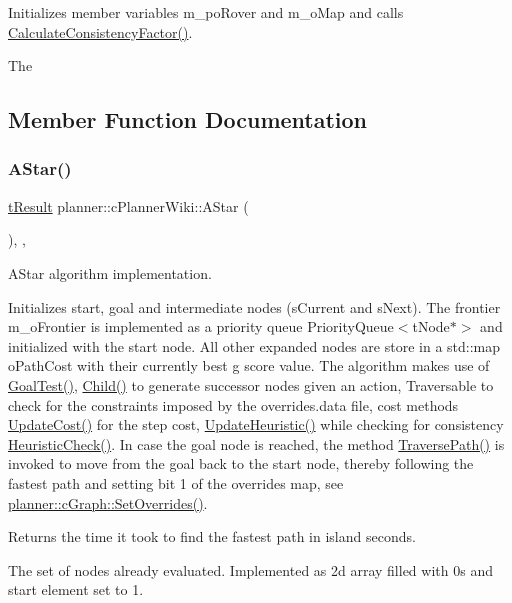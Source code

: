 Initializes member variables m\+\_\+po\+Rover and m\+\_\+o\+Map and calls \mbox{\hyperlink{classplanner_1_1c_planner_a2e5a745f83f903662eff914d8beddb5e}{Calculate\+Consistency\+Factor()}}. 

The 

\subsection{Member Function Documentation}
\mbox{\label{classplanner_1_1c_planner_wiki_a2652cf0e84d0a1fcd17e6c4288179955}} 
\subsubsection{\texorpdfstring{A\+Star()}{AStar()}}
{\footnotesize\ttfamily \mbox{\hyperlink{structt_result}{t\+Result}} planner\+::c\+Planner\+Wiki\+::\+A\+Star (\begin{DoxyParamCaption}{ }\end{DoxyParamCaption})\hspace{0.3cm}{\ttfamily [override]}, {\ttfamily [protected]}, {\ttfamily [virtual]}}



A\+Star algorithm implementation. 

Initializes start, goal and intermediate nodes (s\+Current and s\+Next). The frontier m\+\_\+o\+Frontier is implemented as a priority queue Priority\+Queue$<$t\+Node$\ast$$>$ and initialized with the start node. All other expanded nodes are store in a std\+::map o\+Path\+Cost with their currently best g score value. The algorithm makes use of \mbox{\hyperlink{classplanner_1_1c_planner_a6b7554394efd7ad10d76a49b370aa62f}{Goal\+Test()}}, \mbox{\hyperlink{classplanner_1_1c_planner_adbffc6ce05119c940a09369d7e61554e}{Child()}} to generate successor nodes given an action, Traversable to check for the constraints imposed by the overrides.\+data file, cost methods \mbox{\hyperlink{classplanner_1_1c_planner_a16e8c156297fff49a6ba9b97073baffb}{Update\+Cost()}} for the step cost, \mbox{\hyperlink{classplanner_1_1c_planner_ab7cc7c2666de2e49f745901080aac147}{Update\+Heuristic()}} while checking for consistency \mbox{\hyperlink{classplanner_1_1c_planner_a1234d075676fcaa2c17b859d11b4638c}{Heuristic\+Check()}}. In case the goal node is reached, the method \mbox{\hyperlink{classplanner_1_1c_planner_a8624cb2afb8f2fd216c38b4424013178}{Traverse\+Path()}} is invoked to move from the goal back to the start node, thereby following the fastest path and setting bit 1 of the overrides map, see \mbox{\hyperlink{classplanner_1_1c_graph_a6da6e6e269013628aef48245a7787cb9}{planner\+::c\+Graph\+::\+Set\+Overrides()}}. \begin{DoxyReturn}{Returns}
the time it took to find the fastest path in island seconds. 
\end{DoxyReturn}
The set of nodes already evaluated. Implemented as 2d array filled with 0s and start element set to 1.


